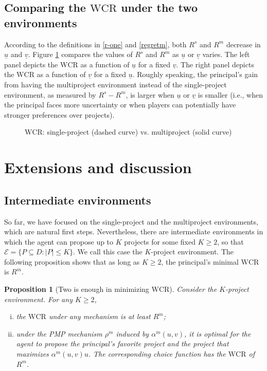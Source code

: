 \documentclass[12pt,english]{article}
\newcommand{\cale}{\mathcal E}
\newcommand{\underv}{\underline{v}}
\newcommand{\under}{\underline}
\newcommand{\underu}{{\underline{u}}}
\theoremstyle{remark}
\theoremstyle{plain}
\newtheorem{proposition}{Proposition}[section]
\theoremstyle{definition}
\newcommand{\wcr}{\mathrm{WCR}}
\begin{document}
  
\subsection{Comparing the $\wcr$ under the two environments}

According to the definitions in \eqref{r-one} and \eqref{regretm}, both $R^s$ and $R^m$ decrease in $\underu$ and $\underv$. Figure \ref{fg:cutoff} compares the values of $R^s$ and $R^m$ as $\underu$ or $\underv$ varies. The left panel depicts the $\wcr$ as a function of $\under u$ for a fixed $\under v$. The right panel depicts the $\wcr$ as a function of $\under v$ for a fixed $\under u$. Roughly speaking, the principal's gain from having the multiproject environment instead of the single-project environment, as measured by $R^s-R^m$, is larger when $\under u$ or $\under v$ is smaller (i.e., when the principal faces more uncertainty or when players can potentially have stronger preferences over projects).  

\begin{figure}[htb!]
\begin{center}

\end{center}
\vspace{-6 mm}
\caption{$\wcr$: single-project (dashed curve) vs. multiproject (solid curve)}
\label{fg:cutoff}
\end{figure}


\section{Extensions and discussion}


\subsection{Intermediate environments}\label{se:intermediate}

So far, we have focused on the single-project and the multiproject environments, which are natural first steps. Nevertheless, there are intermediate environments in which the agent can propose up to $K$ projects for some fixed $K \geqslant 2$, so that $\cale=\{P\subseteq D: |P|\leqslant K \}$. We call this case the $K$-project environment. The following proposition shows that as long as $K\geqslant 2$, the principal's minimal $\wcr$ is $R^m$. 
\begin{proposition}[Two is enough in minimizing $\wcr$]\label{prop:two} Consider the $K$-project environment. For any $K\geqslant 2$,
\begin{enumerate}[(i)]
\vspace{-0.35cm}\item the $\wcr$ under any mechanism is at least $R^m$;
\vspace{-0.35cm}\item under the PMP mechanism $\rho^m$ induced by $\alpha^m(u,v)$, it is optimal for the agent to propose the principal's favorite project and the project that maximizes $\alpha^m(u,v)u$. The corresponding choice function has the $\wcr$ of $R^m$.
\end{enumerate} 
\end{proposition}
\end{document}
